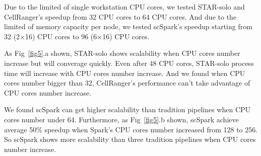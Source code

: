\documentclass[conference]{IEEEtran}
\begin{document}
Due to the limited of single workstation CPU cores, we tested STAR-solo and CellRanger's speedup from 32 CPU cores to 64 CPU cores.
And due to the limited of memory capacity per node, we tested scSpark's speedup starting from 32 (2$\times$16) CPU cores to 96 (6$\times$16) CPU cores.

As Fig~\ref{fig5}.a shown, STAR-solo shows scalability when CPU cores number increase but will converage quickly.
Even after 48 CPU cores, STAR-solo process time will increase with CPU cores number increase. 
And we found when CPU cores number bigger than 32, CellRanger's performance can't take advantage of CPU cores number increase.

We found scSpark can get higher scalability than tradition pipelines when CPU cores number under 64.
Furthermore, as Fig~\ref{fig5}.b shown, scSpark achieve average 50\% speedup when Spark's CPU cores number increased from 128 to 256.
So scSpark shows more scalability than three tradition pipelines when CPU cores number increase.
\end{document}
